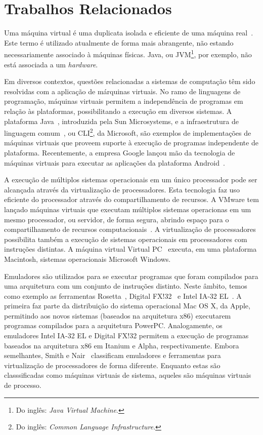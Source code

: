 \documentclass[a4paper,12pt]{article}
\newcommand{\hardware}{\emph{hardware}}
\begin{document}
\section{Trabalhos Relacionados}
\label{sec:trab}
Uma máquina virtual é uma duplicata isolada e eficiente de uma máquina
real~\cite{popek_goldberg}. Este termo é utilizado atualmente de forma mais
abrangente, não estando necessariamente associado à máquinas físicas. Java, ou
JVM\footnote{Do inglês: \emph{Java Virtual Machine}.}, por exemplo, não está
associada a um \hardware.

Em diversos contextos, questões relacionadas a sistemas de computação têm sido
resolvidas com a aplicação de márquinas virtuais. No ramo de linguagens de
programação, máquinas virtuais permitem a independência de programas em relação
às plataformas, possibilitando a execução em diversos sistemas. A plataforma
Java~\cite{java}, introduzida pela Sun Microsystems, e a infraestrutura de
linguagem comum~\cite{cli}, ou CLI\footnote{Do inglês: \emph{Common Language
    Infrastructure}.}, da Microsoft, são exemplos de implementações de máquinas
virtuais que proveem suporte à execução de programas independente de
plataforma. Recentemente, a empresa Google lançou mão da tecnologia de máquinas
virtuais para executar as aplicações da plataforma
Android~\cite{ehringer2010dalvik}.

A execução de múltiplos sistemas operacionais em um único processador pode ser
alcançada através da virtualização de processadores. Esta tecnologia faz uso
eficiente do processador através do compartilhamento de recursos. A VMware tem
lançado máquinas virtuais que executam múltiplos sistemas operacionas em um
mesmo processador, ou servidor, de forma segura, abrindo espaço para o
compartilhamento de recursos computacionais~\cite{vmware}. A virtualização de
processadores possibilita também a execução de sistemas operacionais em
processadores com instruções distintas. A máquina virtual Virtual PC~\cite{pc}
executa, em uma plataforma Macintosh, sistemas operacionais Microsoft Windows.

Emuladores são utilizados para se executar programas que foram compilados para
uma arquitetura com um conjunto de instruções distinto. Neste âmbito, temos como
exemplo as ferramentas Rosetta~\cite{rosetta}, Digital FX!32~\cite{fx} e Intel
IA-32 EL~\cite{intel}. A primeira faz parte da distribuição do sistema
operacional Mac OS X, da Apple, permitindo aos novos sistemas (baseados na
arquitetura x86) executarem programas compilados para a arquitetura
PowerPC. Analogamente, os emuladores Intel IA-32 EL e Digital FX!32 permitem a
execução de programas baseados na arquitetura x86 em Itanium e Alpha,
respectivamente. Embora semelhantes, Smith e Nair~\cite{smith_nair_1}
classificam emuladores e ferramentas para virtualização de processadores de
forma diferente. Enquanto estas são classsificadas como máquinas virtuais de
sistema, aqueles são máquinas virtuais de processo.
\end{document}
